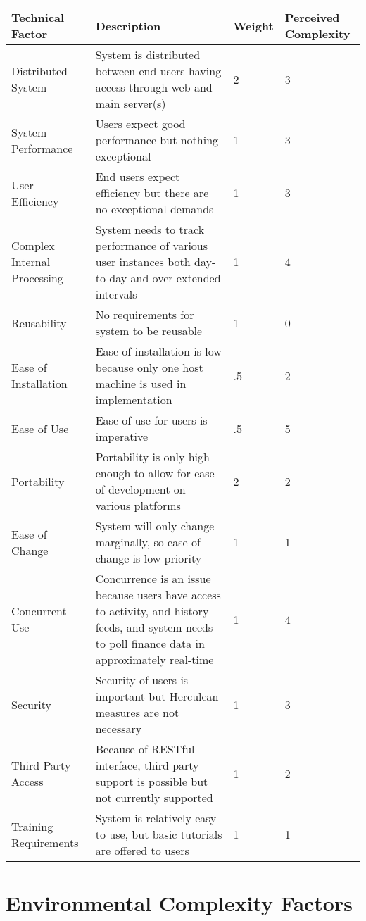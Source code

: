 \renewcommand\arraystretch{2}
\begin{longtable}{|p{1.2in}|p{3.6in}|p{0.5in}|p{.7in}|}
\hline
{\large \color{color1}Technical Factor}&{\large \color{color1}Description}&{\large \color{color1}Weight}&{\large \color{color1}Perceived Complexity} \\ \hline
Distributed System & System is distributed between end users having
access through web and main server(s) & 2 & 3 \\ \hline
System Performance & Users expect good performance but nothing
exceptional & 1 & 3 \\ \hline
User Efficiency & End users expect efficiency but there are no
exceptional demands & 1 & 3 \\ \hline
Complex Internal Processing & System needs to track performance of
various user instances both day-to-day and over extended intervals
& 1 & 4  \\ \hline
Reusability & No requirements for system to be reusable & 1 & 0 \\ \hline
Ease of Installation & Ease of installation is low because only one host machine is used in implementation & .5 & 2 \\ \hline
Ease of Use & Ease of use for users is imperative & .5 & 5 \\ \hline
Portability & Portability is only high enough to allow for ease of development on various platforms & 2 & 2 \\ \hline
Ease of Change & System will only change marginally, so ease of change is low priority & 1 & 1 \\ \hline
Concurrent Use & Concurrence is an issue because users have access to
activity, and history feeds, and system needs to poll finance
data in approximately real-time & 1 & 4 \\ \hline
Security & Security of users is important but Herculean measures are not necessary  & 1 & 3 \\ \hline
Third Party Access & Because of RESTful interface, third party support is possible but not currently supported & 1 & 2 \\ \hline
Training Requirements & System is relatively easy to use, but basic
tutorials are offered to users & 1 & 1 \\ \hline
\end{longtable}

\section{Environmental Complexity Factors}

